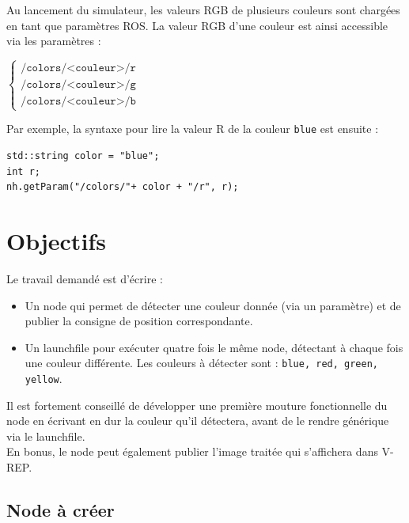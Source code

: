 \documentclass{ecnreport}
\begin{document}
Au lancement du simulateur, les valeurs RGB de plusieurs couleurs sont chargées en tant que paramètres ROS.
La valeur RGB d'une couleur est ainsi accessible via les paramètres :
\begin{center}
 $\left\{\begin{array}{lll}
\texttt{/colors/<couleur>/r} \\ \texttt{/colors/<couleur>/g} \\ \texttt{/colors/<couleur>/b}
         \end{array}\right.$
\end{center}

Par exemple, la syntaxe pour lire la valeur R de la couleur \texttt{blue} est ensuite :
\cppstyle
\begin{lstlisting}
std::string color = "blue";
int r;
nh.getParam("/colors/"+ color + "/r", r);
\end{lstlisting}

\section{Objectifs}


Le travail demandé est d'écrire :
\begin{itemize}
 \item Un node qui permet de détecter une couleur donnée (via un paramètre) et de publier la consigne de position correspondante.
 \item Un launchfile pour exécuter quatre fois le même node, détectant à chaque fois une couleur différente. Les couleurs à détecter sont : \texttt{blue, red, green, yellow}.
\end{itemize}
Il est fortement conseillé de développer une première mouture fonctionnelle du node en écrivant en dur la couleur qu'il détectera, avant de le rendre générique via le launchfile.\\
En bonus, le node peut également publier l'image traitée qui s'affichera dans V-REP. 


\subsection{Node à créer}
\end{document}
